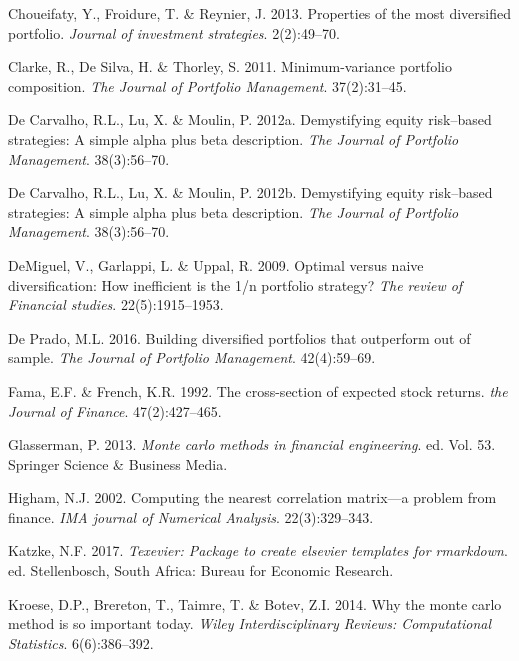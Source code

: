 \documentclass[11pt,preprint, authoryear]{elsarticle}
\numberwithin{equation}{section}
\numberwithin{figure}{section}
\numberwithin{table}{section}
\begin{document}
\leavevmode\hypertarget{ref-choueifaty2013}{}%
Choueifaty, Y., Froidure, T. \& Reynier, J. 2013. Properties of the most
diversified portfolio. \emph{Journal of investment strategies}.
2(2):49--70.

\leavevmode\hypertarget{ref-clarke2011}{}%
Clarke, R., De Silva, H. \& Thorley, S. 2011. Minimum-variance portfolio
composition. \emph{The Journal of Portfolio Management}. 37(2):31--45.

\leavevmode\hypertarget{ref-leote}{}%
De Carvalho, R.L., Lu, X. \& Moulin, P. 2012a. Demystifying equity
risk--based strategies: A simple alpha plus beta description. \emph{The
Journal of Portfolio Management}. 38(3):56--70.

\leavevmode\hypertarget{ref-rawl2012}{}%
De Carvalho, R.L., Lu, X. \& Moulin, P. 2012b. Demystifying equity
risk--based strategies: A simple alpha plus beta description. \emph{The
Journal of Portfolio Management}. 38(3):56--70.

\leavevmode\hypertarget{ref-demiguel2009}{}%
DeMiguel, V., Garlappi, L. \& Uppal, R. 2009. Optimal versus naive
diversification: How inefficient is the 1/n portfolio strategy?
\emph{The review of Financial studies}. 22(5):1915--1953.

\leavevmode\hypertarget{ref-lopez}{}%
De Prado, M.L. 2016. Building diversified portfolios that outperform out
of sample. \emph{The Journal of Portfolio Management}. 42(4):59--69.

\leavevmode\hypertarget{ref-fama1992}{}%
Fama, E.F. \& French, K.R. 1992. The cross-section of expected stock
returns. \emph{the Journal of Finance}. 47(2):427--465.

\leavevmode\hypertarget{ref-glasserman2013}{}%
Glasserman, P. 2013. \emph{Monte carlo methods in financial
engineering}. ed. Vol. 53. Springer Science \& Business Media.

\leavevmode\hypertarget{ref-higham2002}{}%
Higham, N.J. 2002. Computing the nearest correlation matrix---a problem
from finance. \emph{IMA journal of Numerical Analysis}. 22(3):329--343.

\leavevmode\hypertarget{ref-Texevier}{}%
Katzke, N.F. 2017. \emph{Texevier: Package to create elsevier templates
for rmarkdown}. ed. Stellenbosch, South Africa: Bureau for Economic
Research.

\leavevmode\hypertarget{ref-kroese2014}{}%
Kroese, D.P., Brereton, T., Taimre, T. \& Botev, Z.I. 2014. Why the
monte carlo method is so important today. \emph{Wiley Interdisciplinary
Reviews: Computational Statistics}. 6(6):386--392.
\end{document}

